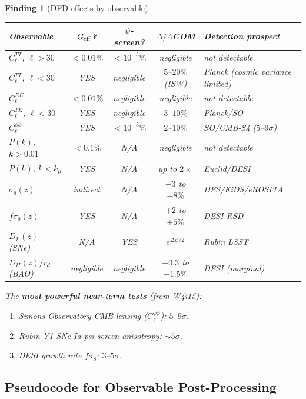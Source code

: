 \documentclass[11pt]{article}
\newtheorem{finding}[theorem]{Finding}
\theoremstyle{definition}
\theoremstyle{remark}
\newcommand{\LCDM}{$\Lambda$CDM}
\begin{document}
\begin{finding}[DFD effects by observable]
\label{find:obs-table}
\begin{center}
\begin{tabular}{@{}lcccl@{}}
\toprule
\textbf{Observable} & \textbf{$G_{\rm eff}$?} &
\textbf{$\psi$-screen?} & \textbf{$\Delta/$\LCDM} &
\textbf{Detection prospect} \\
\midrule
$C_\ell^{TT}$, $\ell > 30$ & $<0.01\%$ & $<10^{-5}\%$ & negligible
  & not detectable \\
$C_\ell^{TT}$, $\ell < 30$ & YES & negligible & $5$--$20\%$ (ISW)
  & Planck (cosmic variance limited) \\
$C_\ell^{EE}$ & $<0.01\%$ & negligible & negligible
  & not detectable \\
$C_\ell^{TE}$, $\ell < 30$ & YES & negligible & $3$--$10\%$
  & Planck/SO \\
$C_\ell^{\phi\phi}$ & YES & $<10^{-5}\%$ & $2$--$10\%$
  & SO/CMB-S4 ($5$--$9\sigma$) \\
$P(k)$, $k > 0.01$ & $<0.1\%$ & N/A & negligible
  & not detectable \\
$P(k)$, $k < k_\mu$ & YES & N/A & up to $2\times$
  & Euclid/DESI \\
$\sigma_8(z)$ & indirect & N/A & $-3$ to $-8\%$
  & DES/KiDS/eROSITA \\
$f\sigma_8(z)$ & YES & N/A & $+2$ to $+5\%$
  & DESI RSD \\
$D_L(z)$ (SNe) & N/A & YES & $e^{\Delta\psi/2}$
  & Rubin LSST \\
$D_H(z)/r_d$ (BAO) & negligible & negligible & $-0.3$ to $-1.5\%$
  & DESI (marginal) \\
\bottomrule
\end{tabular}
\end{center}

The \textbf{most powerful near-term tests} (from W4i15):
\begin{enumerate}[nosep]
\item Simons Observatory CMB lensing ($C_\ell^{\phi\phi}$): $5$--$9\sigma$.
\item Rubin Y1 SNe Ia psi-screen anisotropy: $\sim 5\sigma$.
\item DESI growth rate $f\sigma_8$: $3$--$5\sigma$.
\end{enumerate}
\end{finding}

\subsection{Pseudocode for Observable Post-Processing}
\end{document}
